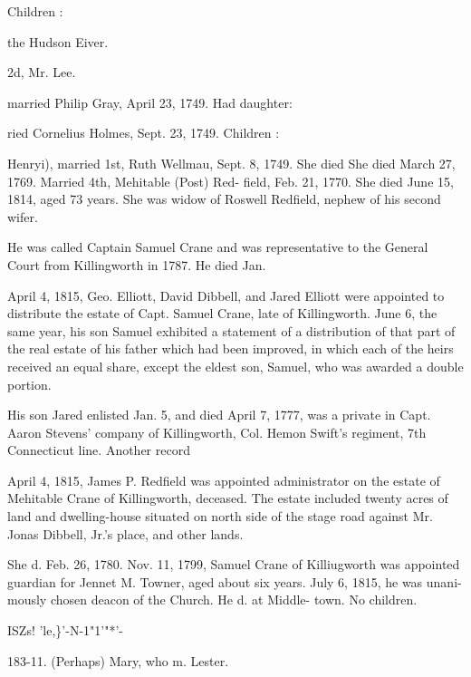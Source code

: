 \documentclass[oneside]{book}
\begin{document}
Children : 








the Hudson Eiver. 

2d, Mr. Lee. 

married Philip Gray, April 23, 1749. Had daughter: 


ried Cornelius Holmes, Sept. 23, 1749. Children : 






Henryi), married 1st, Ruth Wellmau, Sept. 8, 1749. She died 
She died March 27, 1769. Married 4th, Mehitable (Post) Red- 
field, Feb. 21, 1770. She died June 15, 1814, aged 73 years. 
She was widow of Roswell Redfield, nephew of his second wifer. 

He was called Captain Samuel Crane and was representative 
to the General Court from Killingworth in 1787. He died Jan. 

April 4, 1815, Geo. Elliott, David Dibbell, and Jared Elliott 
were appointed to distribute the estate of Capt. Samuel Crane, 
late of Killingworth. June 6, the same year, his son Samuel 
exhibited a statement of a distribution of that part of the real 
estate of his father which had been improved, in which each of 
the heirs received an equal share, except the eldest son, Samuel, 
who was awarded a double portion. 

His son Jared enlisted Jan. 5, and died April 7, 1777, was a 
private in Capt. Aaron Stevens' company of Killingworth, Col. 
Hemon Swift's regiment, 7th Connecticut line. Another record 

April 4, 1815, James P. Redfield was appointed administrator 
on the estate of Mehitable Crane of Killingworth, deceased. The 
estate included twenty acres of land and dwelling-house situated 
on north side of the stage road against Mr. Jonas Dibbell, Jr.'s 
place, and other lands. 




She d. Feb. 26, 1780. Nov. 11, 1799, Samuel Crane of 
Killiugworth was appointed guardian for Jennet M. 
Towner, aged about six years. July 6, 1815, he was unani- 
mously chosen deacon of the Church. He d. at Middle- 
town. No children. 






ISZs! 'le,\}'-N-1"1'"*'- 



183-11. (Perhaps) Mary, who m. Lester. 
\end{document}
